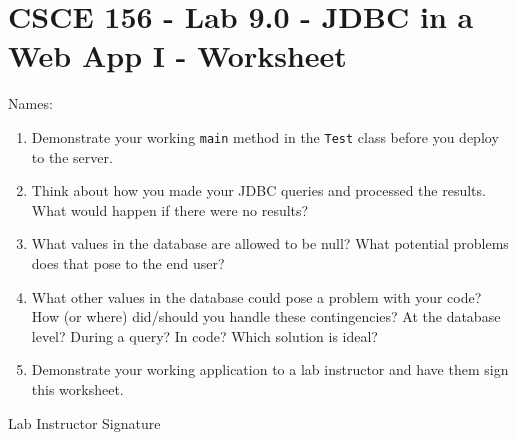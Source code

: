 \documentclass[12pt]{scrartcl}
\begin{document}
\section*{CSCE 156 - Lab 9.0 - JDBC in a Web App I - Worksheet}

Names: \underline{\hspace{10cm}}

\begin{enumerate}

  \item Demonstrate your working \texttt{main} method 
  in the \texttt{Test} class before you deploy to the server.

  \item Think about how you made your JDBC queries and processed 
  the results.  What would happen if there were no results?  

  \item What values in the database are allowed to be null?  What 
  potential problems does that pose to the end user?
  
  \item What other values in the database could pose a problem 
  with your code?  How (or where) did/should you handle these 
  contingencies?  At the database level?  During a query?  
  In code?  Which solution is ideal?

  \item Demonstrate your working application to a lab instructor 
  and have them sign this worksheet.

\end{enumerate}

Lab Instructor Signature\underline{\hspace{7.5cm}}
\end{document}
